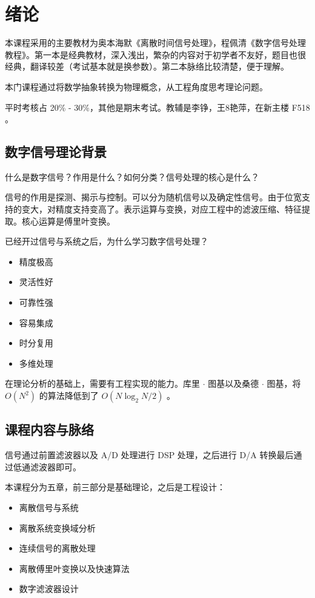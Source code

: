 \documentclass[cn,11pt,chinese,black,simple]{../elegantbook}
\begin{document}
\fi 
\def\chapname{00intro}

\chapter{绪论}

本课程采用的主要教材为奥本海默《离散时间信号处理》，程佩清《数字信号处理教程》。第一本是经典教材，深入浅出，繁杂的内容对于初学者不友好，题目也很经典，翻译较差（考试基本就是换参数）。第二本脉络比较清楚，便于理解。

本门课程通过将数学抽象转换为物理概念，从工程角度思考理论问题。

平时考核占 20\% - 30\%，其他是期末考试。教辅是李铮，王8艳萍，在新主楼 F518 。

\section{数字信号理论背景}

什么是数字信号？作用是什么？如何分类？信号处理的核心是什么？

信号的作用是探测、揭示与控制。可以分为随机信号以及确定性信号。由于位宽支持的变大，对精度支持变高了。表示运算与变换，对应工程中的滤波压缩、特征提取。核心运算是傅里叶变换。

已经开过信号与系统之后，为什么学习数字信号处理？

\begin{itemize}
    \item 精度极高
    \item 灵活性好
    \item 可靠性强
    \item 容易集成
    \item 时分复用
    \item 多维处理
\end{itemize}

在理论分析的基础上，需要有工程实现的能力。库里 \(\cdot\) 图基以及桑德 \(\cdot\) 图基，将 \(O(N^2)\) 的算法降低到了 \(O(N\log_2 N / 2)\) 。

\section{课程内容与脉络}

信号通过前置滤波器以及 A/D 处理进行 DSP 处理，之后进行 D/A 转换最后通过低通滤波器即可。

本课程分为五章，前三部分是基础理论，之后是工程设计：

\begin{itemize}
    \item 离散信号与系统
    \item 离散系统变换域分析
    \item 连续信号的离散处理
    \item 离散傅里叶变换以及快速算法
    \item 数字滤波器设计
\end{itemize}


\let\chapname\undefined
\ifx\mainclass\undefined
\end{document}
